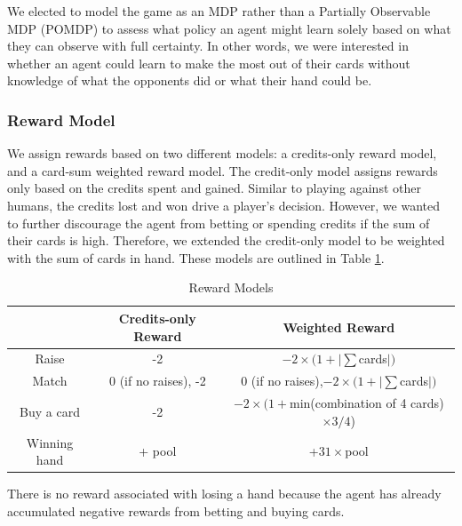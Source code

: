 \documentclass{article}
\begin{document}
We elected to model the game as an MDP rather than a Partially Observable MDP (POMDP) to assess what policy an agent might learn solely based on what they can observe with full certainty. In other words, we were interested in whether an agent could learn to make the most out of their cards without knowledge of what the opponents did or what their hand could be. 
\subsubsection{Reward Model}
We assign rewards based on two different models: a credits-only reward model, and a card-sum weighted reward model. The credit-only model assigns rewards only based on the credits spent and gained. Similar to playing against other humans, the credits lost and won drive a player's decision. However, we wanted to further discourage the agent from betting or spending credits if the sum of their cards is high. Therefore, we extended the credit-only model to be weighted with the sum of cards in hand. These models are outlined in Table \ref{tab:rewards}.
\begin{table}[H]
\centering
\caption{Reward Models}
\begin{tabular}{c|c|c}
& \textbf{Credits-only Reward} & \textbf{Weighted Reward}\\ \hline
Raise & -2 & $-2\times (1+|\sum$cards$|)$ \\ \hline
Match& 0 (if no raises), -2 & 0 (if no raises),$-2\times (1+|\sum$cards$|)$ \\ \hline
Buy a card   & -2                       & $-2\times (1+$min(combination of 4 cards)$\times3/4$)\\ \hline
Winning hand & + pool         & +$31\times$pool
\end{tabular}
\label{tab:rewards}
\end{table}
There is no reward associated with losing a hand because the agent has already accumulated negative rewards from betting and buying cards.
\end{document}
